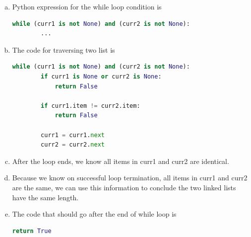 \documentclass[12pt]{article}
\begin{document}
\begin{enumerate}[a.]
\begin{mdframed}
    \bigskip

    Using this fact, the python expression involving \textit{curr1}
    and \textit{curr2} that expresses the stopping condition is

    \bigskip

    \begin{lstlisting}[language=Python]
    (curr1 is None) and (curr2 is None) # <- Correct Solution
    \end{lstlisting}
    \end{mdframed}

    \item

    Python expression for the while loop condition is

    \begin{lstlisting}[language=Python]
    while (curr1 is not None) and (curr2 is not None):
        ...
    \end{lstlisting}

    \item

    The code for traversing two list is

    \begin{lstlisting}[language=Python]
    while (curr1 is not None) and (curr2 is not None):
        if curr1 is None or curr2 is None:
            return False

        if curr1.item != curr2.item:
            return False

        curr1 = curr1.next
        curr2 = curr2.next
    \end{lstlisting}

    \item

    After the loop ends, we know all items in curr1 and curr2 are identical.

    \item

    Because we know on successful loop termination, all items in curr1 and curr2
    are the same, we can use this information to conclude the two linked lists
    have the same length.

    \item

    The code that should go after the end of while loop is

    \begin{lstlisting}[language=Python]
    return True
    \end{lstlisting}


\end{enumerate}
\end{document}
